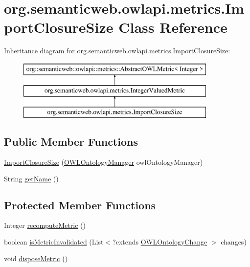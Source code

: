 \hypertarget{classorg_1_1semanticweb_1_1owlapi_1_1metrics_1_1_import_closure_size}{\section{org.\-semanticweb.\-owlapi.\-metrics.\-Import\-Closure\-Size Class Reference}
\label{classorg_1_1semanticweb_1_1owlapi_1_1metrics_1_1_import_closure_size}
}
Inheritance diagram for org.\-semanticweb.\-owlapi.\-metrics.\-Import\-Closure\-Size\-:\begin{figure}[H]
\begin{center}
\leavevmode
\includegraphics[height=3.000000cm]{classorg_1_1semanticweb_1_1owlapi_1_1metrics_1_1_import_closure_size}
\end{center}
\end{figure}
\subsection*{Public Member Functions}
\begin{DoxyCompactItemize}
\item 
\hyperlink{classorg_1_1semanticweb_1_1owlapi_1_1metrics_1_1_import_closure_size_afd415aefa2f0ada3abd731a044ab385b}{Import\-Closure\-Size} (\hyperlink{interfaceorg_1_1semanticweb_1_1owlapi_1_1model_1_1_o_w_l_ontology_manager}{O\-W\-L\-Ontology\-Manager} owl\-Ontology\-Manager)
\item 
String \hyperlink{classorg_1_1semanticweb_1_1owlapi_1_1metrics_1_1_import_closure_size_a5dc149a0af777140c994db56c43e8ab7}{get\-Name} ()
\end{DoxyCompactItemize}
\subsection*{Protected Member Functions}
\begin{DoxyCompactItemize}
\item 
Integer \hyperlink{classorg_1_1semanticweb_1_1owlapi_1_1metrics_1_1_import_closure_size_a15a605156fae3395a0177d8201b80313}{recompute\-Metric} ()
\item 
boolean \hyperlink{classorg_1_1semanticweb_1_1owlapi_1_1metrics_1_1_import_closure_size_a27314602ed47610f567068ec2144c4bc}{is\-Metric\-Invalidated} (List$<$?extends \hyperlink{classorg_1_1semanticweb_1_1owlapi_1_1model_1_1_o_w_l_ontology_change}{O\-W\-L\-Ontology\-Change} $>$ changes)
\item 
void \hyperlink{classorg_1_1semanticweb_1_1owlapi_1_1metrics_1_1_import_closure_size_a3b56d5268fe8118396521a9c9ca3bba4}{dispose\-Metric} ()
\end{DoxyCompactItemize}


